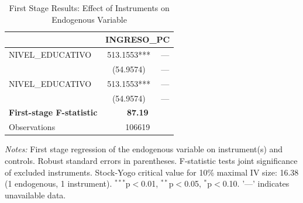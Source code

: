 \begin{table}[htbp]
\centering
\caption{First Stage Results: Effect of Instruments on Endogenous Variable}
\label{tab:first_stage}
\begin{tabular}{l cc}
\toprule
  & \multicolumn{2}{c}{INGRESO_PC} \\
\midrule
  NIVEL_EDUCATIVO & 513.1553*** & --- \\
  & (54.9574) & --- \\
  NIVEL_EDUCATIVO & 513.1553*** & --- \\
  & (54.9574) & --- \\
\addlinespace
\midrule
  \textbf{First-stage F-statistic} & \multicolumn{2}{c}{\textbf{87.19}} \\
  Observations & \multicolumn{2}{c}{106619} \\
\bottomrule
\end{tabular}
\begin{tablenotes}
\small
\item \textit{Notes:} First stage regression of the endogenous variable on instrument(s) and controls. Robust standard errors in parentheses. F-statistic tests joint significance of excluded instruments. Stock-Yogo critical value for 10\% maximal IV size: 16.38 (1 endogenous, 1 instrument). $^{***}$p$<$0.01, $^{**}$p$<$0.05, $^{*}$p$<$0.10. '---' indicates unavailable data.
\end{tablenotes}
\end{table}